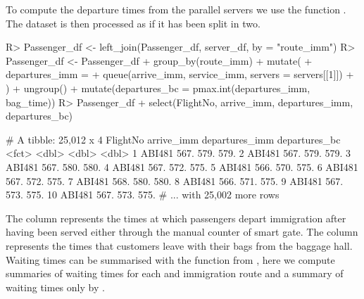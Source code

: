 \documentclass[article]{jss}
\begin{document}
To compute the departure times from the parallel servers we use the  function . The dataset is then processed as if it has been split in two. 

\begin{CodeChunk}
\begin{Sinput}
R> Passenger_df <- left_join(Passenger_df, server_df, by = "route_imm")
R> Passenger_df <- Passenger_df %
+    group_by(route_imm) %
+    mutate(
+      departures_imm = 
+        queue(arrive_imm, service_imm, servers = servers[[1]])
+      ) %
+    ungroup() %
+    mutate(departures_bc = pmax.int(departures_imm, bag_time))
R> Passenger_df %
+    select(FlightNo, arrive_imm, departures_imm, departures_bc)
\end{Sinput}
\begin{Soutput}
# A tibble: 25,012 x 4
   FlightNo arrive_imm departures_imm departures_bc
   <fct>         <dbl>          <dbl>         <dbl>
 1 ABI481         567.           579.          579.
 2 ABI481         567.           579.          579.
 3 ABI481         567.           580.          580.
 4 ABI481         567.           572.          575.
 5 ABI481         566.           570.          575.
 6 ABI481         567.           572.          575.
 7 ABI481         568.           580.          580.
 8 ABI481         566.           571.          575.
 9 ABI481         567.           573.          575.
10 ABI481         567.           573.          575.
# ... with 25,002 more rows
\end{Soutput}
\end{CodeChunk}

The column  represents the times at which passengers depart immigration after having been served either through the manual counter of smart gate. The column  represents the times that customers leave with their bags from the baggage hall. Waiting times can be summarised with the  function from , here we compute summaries of waiting times for each  and immigration route  and a summary of waiting times only by . 
\end{document}

